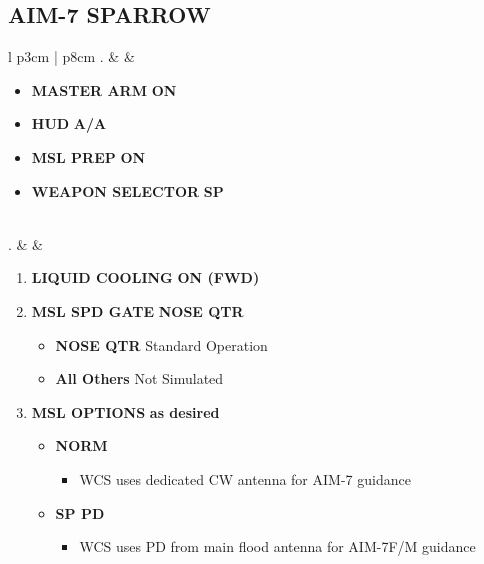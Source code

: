 \documentclass[8pt,usenames,dvipsnames,twoside]{article}
\begin{document}
		\subsection{AIM-7 SPARROW}
		\begin{center}
			\begin{tabular}{l p{3cm} | p{8cm}}
				. &  & 
				\begin{minipage}[t]{\linewidth}
					\vspace{-7pt}
					\begin{itemize}
						\item \textbf{MASTER ARM} \dotfill \textbf{ON}
						\item \textbf{HUD} \dotfill \textbf{A/A}
						\item \textbf{MSL PREP} \dotfill \textbf{ON}
						\item \textbf{WEAPON SELECTOR} \dotfill \textbf{SP}
					\end{itemize} 
				\end{minipage} \\
				. &  & 
				\begin{minipage}[t]{\linewidth}
					\vspace{-7pt}
					\begin{enumerate}[label=(\alph*)]
						\item \textbf{LIQUID COOLING} \dotfill \textbf{ON (FWD)}
						\item \textbf{MSL SPD GATE} \dotfill \textbf{NOSE QTR}
						\begin{itemize}
							\item \textbf{NOSE QTR} Standard Operation
							\item \textbf{All Others} Not Simulated
						\end{itemize}
						\item \textbf{MSL OPTIONS} \dotfill \textbf{as desired}
						\begin{itemize}
							\item \textbf{NORM}
							\begin{itemize}
								\item WCS uses dedicated CW antenna for AIM-7 guidance
							\end{itemize}
							\item \textbf{SP PD}
							\begin{itemize}
								\item WCS uses PD from main flood antenna for AIM-7F/M guidance
							\end{itemize}

\end{itemize}
\end{enumerate}
\end{minipage}
\end{tabular}
\end{center}
\end{document}
